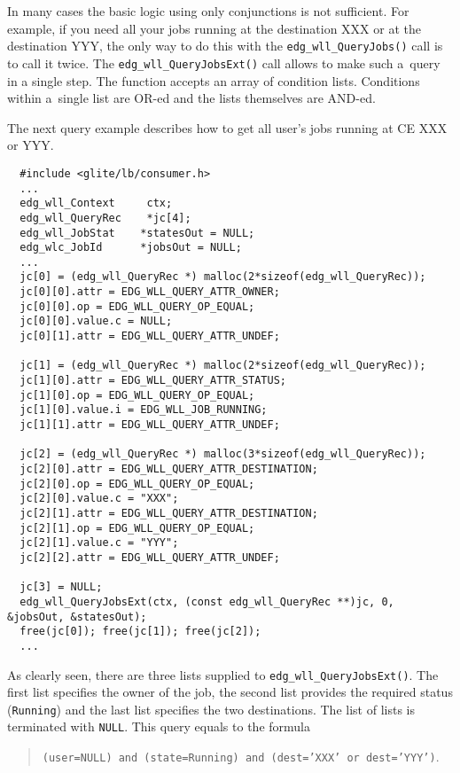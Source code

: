 \label{JQ-AO}
In many cases the basic logic using only conjunctions is not sufficient.
For example, if you need all your jobs running at the destination XXX or at
the destination YYY, the only way to do this with the \texttt{edg\_wll\_QueryJobs()}
call is to call it twice. The \texttt{edg\_wll\_QueryJobsExt()} call allows to make
such a~query in a single step.
The function accepts an array of condition lists. Conditions within a~single list are
OR-ed and the lists themselves are AND-ed. 

The next query example describes how to get all user's jobs running at
CE XXX or YYY.
\begin{verbatim}
  #include <glite/lb/consumer.h>
  ...
  edg_wll_Context     ctx;    
  edg_wll_QueryRec    *jc[4];
  edg_wll_JobStat    *statesOut = NULL;
  edg_wlc_JobId      *jobsOut = NULL;
  ...
  jc[0] = (edg_wll_QueryRec *) malloc(2*sizeof(edg_wll_QueryRec));
  jc[0][0].attr = EDG_WLL_QUERY_ATTR_OWNER;
  jc[0][0].op = EDG_WLL_QUERY_OP_EQUAL;
  jc[0][0].value.c = NULL;
  jc[0][1].attr = EDG_WLL_QUERY_ATTR_UNDEF;

  jc[1] = (edg_wll_QueryRec *) malloc(2*sizeof(edg_wll_QueryRec));
  jc[1][0].attr = EDG_WLL_QUERY_ATTR_STATUS;
  jc[1][0].op = EDG_WLL_QUERY_OP_EQUAL;
  jc[1][0].value.i = EDG_WLL_JOB_RUNNING;
  jc[1][1].attr = EDG_WLL_QUERY_ATTR_UNDEF;

  jc[2] = (edg_wll_QueryRec *) malloc(3*sizeof(edg_wll_QueryRec));
  jc[2][0].attr = EDG_WLL_QUERY_ATTR_DESTINATION;
  jc[2][0].op = EDG_WLL_QUERY_OP_EQUAL;
  jc[2][0].value.c = "XXX";
  jc[2][1].attr = EDG_WLL_QUERY_ATTR_DESTINATION;
  jc[2][1].op = EDG_WLL_QUERY_OP_EQUAL;
  jc[2][1].value.c = "YYY";
  jc[2][2].attr = EDG_WLL_QUERY_ATTR_UNDEF;

  jc[3] = NULL;
  edg_wll_QueryJobsExt(ctx, (const edg_wll_QueryRec **)jc, 0, &jobsOut, &statesOut);
  free(jc[0]); free(jc[1]); free(jc[2]);
  ...
\end{verbatim}

As clearly seen, there are three lists supplied to
\texttt{edg\_wll\_QueryJobsExt()}. The first list specifies the owner of the
job, the second list provides the required status (\texttt{Running}) and
the last list specifies the two destinations. 
The list of lists is terminated with \texttt{NULL}.
This query equals to the formula 
\begin{quote}
\texttt{(user=NULL) and (state=Running) and (dest='XXX' or dest='YYY')}.
\end{quote}

